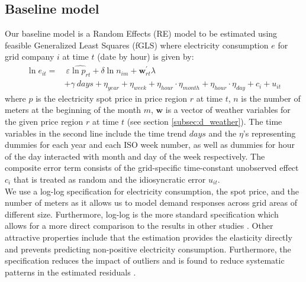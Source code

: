 \label{sec:empirical}
\subsection{Baseline model}
\label{subsec:e_model}
Our baseline model is a Random Effects (RE) model to be estimated using feasible Generalized Least Squares (fGLS) where electricity consumption $e$ for grid company $i$ at time $t$ (date by hour) is given by:
\begin{equation}
  \label{eq:baseline}
  \begin{split}
  \ln e_{it}=&\ \varepsilon \widehat{\ln p_{rt}}+\delta\ln n_{im}+\bm{w}^{'}_{rt}\lambda\\
  &+\gamma\ days+\eta_{year}+\eta_{week}+\eta_{hour}\cdot\eta_{month}+\eta_{hour}\cdot\eta_{day}+c_i+u_{it}
  \end{split}
\end{equation}
where $p$ is the electricity spot price in price region $r$ at time $t$, $n$ is the number of meters at the beginning of the month $m$, $\bm{w}$ is a vector of weather variables for the given price region $r$ at time $t$ (see section \ref{subsec:d_weather}). The time variables in the second line include the time trend $days$ and the $\eta$'s representing dummies for each year and each ISO week number, as well as dummies for hour of the day interacted with month and day of the week respectively. The composite error term consists of the grid-specific time-constant unobserved effect $c_i$ that is treated as random and the idiosyncratic error $u_{it}$.
\medskip\\
We use a log-log specification for electricity consumption, the spot price, and the number of meters as it allows us to model demand responses across grid areas of different size. Furthermore, log-log is the more standard specification which allows for a more direct comparison to the results in other studies \citep{burke2017price}. Other attractive properties include that the estimation provides the elasticity directly and prevents predicting non-positive electricity consumption. Furthermore, the specification reduces the impact of outliers and is found to reduce systematic patterns in the estimated residuals \citep{burke2017price}.


